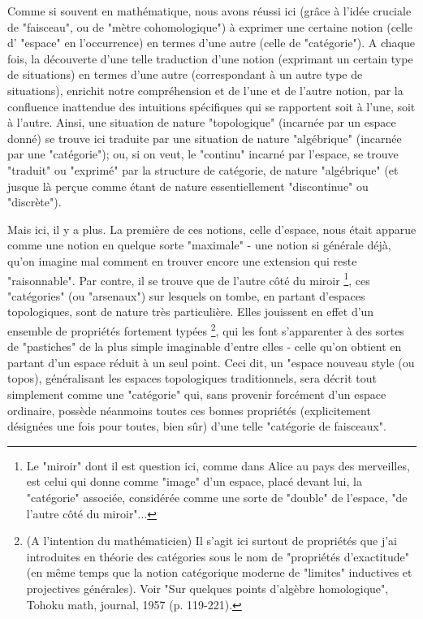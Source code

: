 Comme si souvent en mathématique, nous avons réussi ici (grâce à l'idée cruciale de "faisceau", ou de "mètre cohomologique") à exprimer une certaine notion (celle d' "espace" en l'occurrence) en termes d'une autre (celle de "catégorie"). A chaque fois, la découverte d'une telle traduction d'une notion (exprimant un certain type de situations) en termes d'une autre (correspondant à un autre type de situations), enrichit notre compréhension et de l'une et de l'autre notion, par la confluence inattendue des intuitions spécifiques qui se rapportent soit à l'une, soit à l'autre. Ainsi, une situation de nature "topologique" (incarnée par un espace donné) se trouve ici traduite par une situation de nature "algébrique" (incarnée par une "catégorie"); ou, si on veut, le "continu" incarné par l'espace, se trouve "traduit" ou "exprimé" par la structure de catégorie, de nature "algébrique" (et jusque là perçue comme étant de nature essentiellement "discontinue" ou "discrète").

Mais ici, il y a plus. La première de ces notions, celle d'espace, nous était apparue comme une notion en quelque sorte "maximale" - une notion si générale déjà, qu'on imagine mal comment en trouver encore une extension qui reste "raisonnable". Par contre, il se trouve que de l'autre côté du miroir \footnote{Le "miroir" dont il est question ici, comme dans Alice au pays des merveilles, est celui qui donne comme "image" d'un espace, placé devant lui, la "catégorie" associée, considérée comme une sorte de "double" de l'espace, "de l'autre côté du miroir"...}, ces "catégories" (ou "arsenaux") sur lesquels on tombe, en partant d'espaces topologiques, sont de nature très particulière. Elles jouissent en effet d'un ensemble de propriétés fortement typées \footnote{(A l'intention du mathématicien) Il s'agit ici surtout de propriétés que j'ai introduites en théorie des catégories sous le nom de "propriétés d'exactitude" (en même temps que la notion catégorique moderne de "limites" inductives et projectives générales). Voir "Sur quelques points d'algèbre homologique", Tohoku math, journal, 1957 (p. 119-221).}, qui les font s'apparenter à des sortes de "pastiches" de la plus simple imaginable d'entre elles - celle qu'on obtient en partant d'un espace réduit à un seul point. Ceci dit, un "espace nouveau style (ou topos), généralisant les espaces topologiques traditionnels, sera décrit tout simplement comme une "catégorie" qui, sans provenir forcément d'un espace ordinaire, possède néanmoins toutes ces bonnes propriétés (explicitement désignées une fois pour toutes, bien sûr) d'une telle "catégorie de faisceaux".

